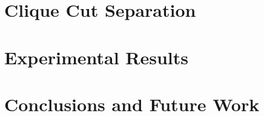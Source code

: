 \documentclass{endm}
\begin{document}
\section{Clique Cut Separation}\label{cut}
\section{Experimental Results}\label{experiments}
\section{Conclusions and Future Work}\label{conclusions}



\end{document}
